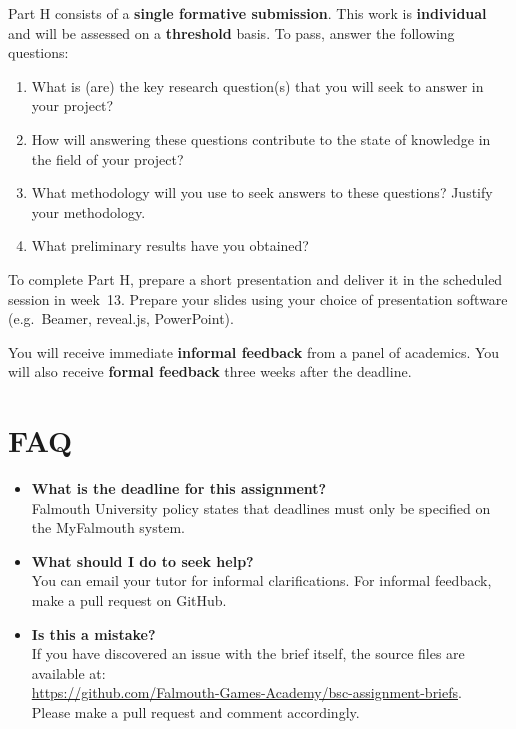 Part H consists of a \textbf{single formative submission}.
This work is \textbf{individual} and will be assessed on a \textbf{threshold} basis.
To pass, answer the following questions:

\begin{enumerate}[label=(\roman*)]
	\item What is (are) the key research question(s) that you will seek to
		answer in your project?
	\item How will answering these questions contribute to the state of knowledge
		in the field of your project?
	\item What methodology will you use to seek answers to these questions?
		Justify your methodology.
	\item What preliminary results have you obtained?
\end{enumerate}

To complete Part H, prepare a short presentation 
and deliver it in the scheduled session in week~13.
Prepare your slides using your choice of presentation software
(e.g.\ Beamer, reveal.js, PowerPoint).

You will receive immediate \textbf{informal feedback} from a panel of academics.
You will also receive \textbf{formal feedback} three weeks after the deadline.

\section*{FAQ}

\begin{itemize}
	\item 	\textbf{What is the deadline for this assignment?} \\ 
    		Falmouth University policy states that deadlines must only be specified on the MyFalmouth system.
    		
	\item 	\textbf{What should I do to seek help?} \\ 
    		You can email your tutor for informal clarifications. For informal feedback, make a pull request on GitHub. 
    		
    	\item 	\textbf{Is this a mistake?} \\ 	
    		If you have discovered an issue with the brief itself, the source files are available at: \\
    		\url{https://github.com/Falmouth-Games-Academy/bsc-assignment-briefs}.\\
    		 Please make a pull request and comment accordingly.
\end{itemize}

